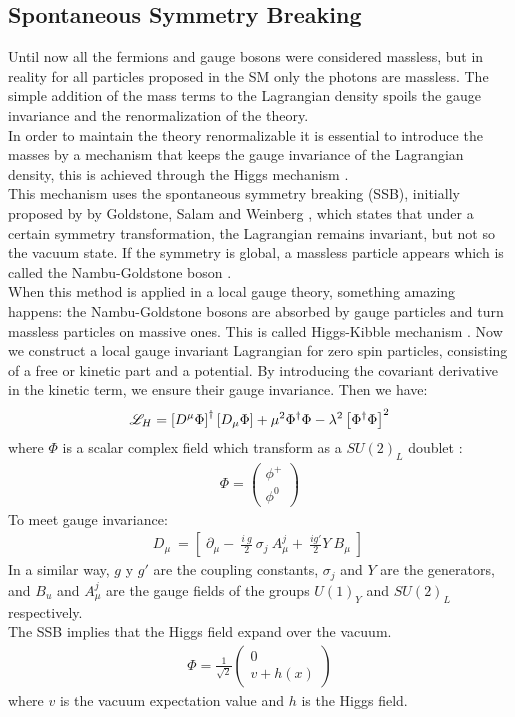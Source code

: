 \subsection{Spontaneous Symmetry Breaking}\label{QES}

Until now all the fermions and gauge bosons were considered massless, but in reality for all particles proposed in the SM only
the photons are massless. The simple addition of the mass terms to the Lagrangian density spoils the gauge invariance and the renormalization of the theory.\\
\indent
In order to maintain the theory renormalizable it is essential to introduce the masses by a mechanism that keeps the gauge invariance
of the Lagrangian density, this is achieved through the Higgs mechanism \cite{higgs}.\\
\indent
This mechanism uses the spontaneous symmetry breaking  (SSB), initially proposed by  by Goldstone, Salam and Weinberg \cite{goldstone1}, which states that under a certain symmetry transformation, the Lagrangian remains invariant, but not so the vacuum state. If the symmetry is global, a massless particle appears which is called the Nambu-Goldstone boson \cite{nambu,gold2}.\\
\indent
When this method is applied in a local gauge theory, something amazing happens: the Nambu-Goldstone bosons are absorbed by gauge particles and turn massless particles on massive ones. This is called Higgs-Kibble mechanism \cite{higgs,kibble}.
Now we construct a local gauge invariant Lagrangian for
zero spin particles, consisting of a free or kinetic part and a potential. By introducing the covariant derivative in the kinetic term, we ensure their gauge invariance.
Then we have:
\begin{eqnarray}
\mathscr{L}_{H}=\left[D^{\mu}\Phi\right]^{\dagger}\left[D_{\mu}\Phi\right]+\mu^{2}\Phi^{\dagger}\Phi-\lambda^{2}\left[\Phi^{\dagger}\Phi\right]^{2}
\end{eqnarray}
where $\Phi$ is a scalar complex field  which transform as a $SU(2)_{L}$ doublet :
\begin{eqnarray}
\Phi=\left(\begin{array}{c}
\phi^{+}\\
\phi^{0}
\end{array}\right)
\end{eqnarray}
To meet gauge invariance: 
\begin{eqnarray}
D_{\mu}\:=\left[\;\partial_{\mu}-\:\frac{i\:g}{2}\:\sigma_{j}\:A^{j}_{\mu}+\:\frac{ig'}{2}Y\:B_{\mu}\;\right]\:\nonumber
\end{eqnarray}
In a similar way, $g$ y $g'$ are the coupling constants, $\sigma_{j}$ and $Y$ are the generators, and $B_{u}$ and $A^{j}_{\mu}$ are the gauge fields of the groups $U(1)_{Y}$ and $SU(2)_{L}$ respectively.\\
The SSB implies that the Higgs field expand over the vacuum.
\begin{eqnarray}
\Phi=\frac{1}{\sqrt{2}}\left(\begin{array}{c}
0\\
v+h(x)
\end{array}\right)
\end{eqnarray}
where $v$  is the vacuum expectation value and $h$ is the Higgs field.

